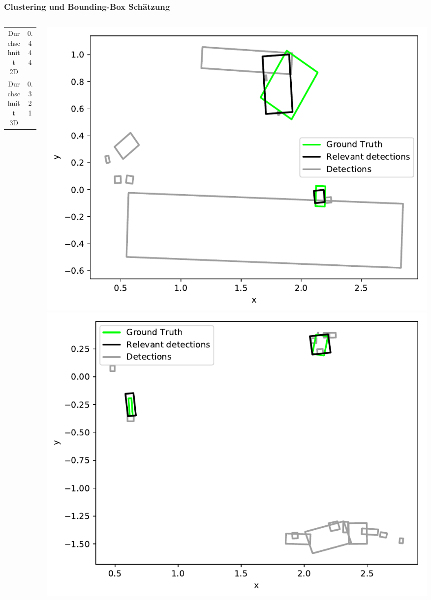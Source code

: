 \begin{frame}
    \frametitle{Clustering und Bounding-Box Schätzung}
    \begin{columns}
        \begin{column}{.5\textwidth}
            \begin{tabular}{cc}
                \toprule
                Durchschnitt 2D & 0.444 \\
                Durchschnitt 3D & 0.321 \\
                \bottomrule
            \end{tabular}
        \end{column}
        \begin{column}{.5\textwidth}
            \includegraphics[width=\textwidth]{../Material/iou0.pdf}
            \includegraphics[width=\textwidth]{../Material/iou2.pdf}
        \end{column}
    \end{columns}
\end{frame}

